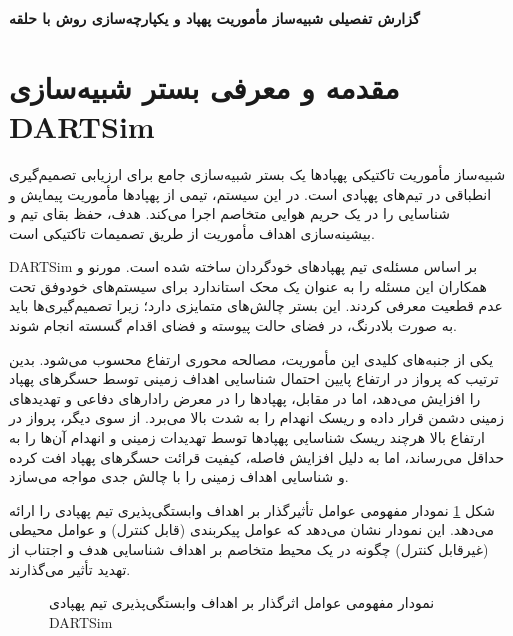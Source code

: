 \documentclass[oneside,openany,a4paper,12pt,draft]{article}
\providecommand{\AutoPersianDigits}{}
\begin{document}
\AutoPersianDigits
{}

\begin{center}
    \vspace*{1cm}
    \Huge\textbf{گزارش تفصیلی شبیه‌ساز مأموریت پهپاد  و یکپارچه‌سازی روش  با حلقه }
\end{center}

\newpage
\tableofcontents
\newpage

\section{مقدمه و معرفی بستر شبیه‌سازی DARTSim}
شبیه‌ساز مأموریت تاکتیکی پهپادها  \cite{MorenoDART2019} یک بستر شبیه‌سازی جامع برای ارزیابی تصمیم‌گیری انطباقی در تیم‌های پهپادی است. در این سیستم، تیمی از پهپادها مأموریت پیمایش و شناسایی را در یک حریم هوایی متخاصم اجرا می‌کند. هدف، حفظ بقای تیم و بیشینه‌سازی اهداف مأموریت از طریق تصمیمات تاکتیکی است.

DARTSim بر اساس مسئله‌ی تیم پهپادهای خودگردان  ساخته شده است. مورنو و همکاران \cite{moreno2015proactive} این مسئله را به عنوان یک محک استاندارد برای سیستم‌های خودوفق تحت عدم قطعیت معرفی کردند. این بستر چالش‌های متمایزی دارد؛ زیرا تصمیم‌گیری‌ها باید به صورت بلادرنگ، در فضای حالت پیوسته و فضای اقدام گسسته انجام شوند.

یکی از جنبه‌های کلیدی این مأموریت، مصالحه محوری ارتفاع  محسوب می‌شود. بدین ترتیب که پرواز در ارتفاع پایین احتمال شناسایی اهداف زمینی توسط حسگرهای پهپاد را افزایش می‌دهد، اما در مقابل، پهپادها را در معرض رادارهای دفاعی و تهدیدهای زمینی دشمن قرار داده و ریسک انهدام را به شدت بالا می‌برد. از سوی دیگر، پرواز در ارتفاع بالا هرچند ریسک شناسایی پهپادها توسط تهدیدات زمینی و انهدام آن‌ها را به حداقل می‌رساند، اما به دلیل افزایش فاصله، کیفیت قرائت حسگرهای پهپاد افت کرده و شناسایی اهداف زمینی را با چالش جدی مواجه می‌سازد.

شکل \ref{fig:dartsim_system_diagram} نمودار مفهومی عوامل تأثیرگذار بر اهداف وابستگی‌پذیری تیم پهپادی را ارائه می‌دهد. این نمودار نشان می‌دهد که عوامل پیکربندی (قابل کنترل) و عوامل محیطی (غیرقابل کنترل) چگونه در یک محیط متخاصم بر اهداف شناسایی هدف و اجتناب از تهدید تأثیر می‌گذارند.

\begin{figure}[H]
  \centering
  \caption{نمودار مفهومی عوامل اثرگذار بر اهداف وابستگی‌پذیری تیم پهپادی DARTSim}
  \label{fig:dartsim_system_diagram}
\end{figure}
\end{document}
